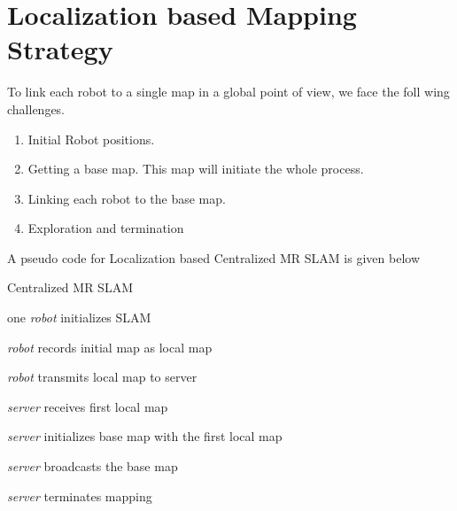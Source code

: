 \documentclass[MTech]{iitmdiss}
\begin{document}
\section{Localization based Mapping Strategy}
To link each robot to a single map in a global point of view, we face the foll wing challenges.
\begin{enumerate}
    \item Initial Robot positions.
    \item Getting a base map. This map will initiate the whole process.
    \item Linking each robot to the base map.
    \item Exploration and termination
\end{enumerate}



A pseudo code for Localization based Centralized MR SLAM is given below
\begin{algorithm}
 \caption{Centralized MR SLAM}\label{algorithm1}
 
 one \textit{robot} initializes SLAM\;
 
 \textit{robot} records initial map as local map\;
 
 \textit{robot} transmits local map to server\;
 
 \textit{server} receives first local map\;
 
 \textit{server} initializes base map with the first local map\;
 
 \textit{server} broadcasts the base map\;
 
 \textit{server} terminates mapping\;
 
\end{algorithm}
\end{document}
